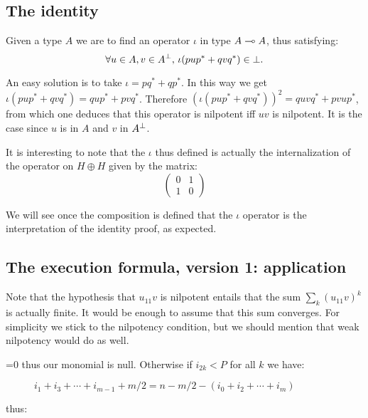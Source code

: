 \subsection{The identity}\label{the-identity}

Given a type \(A\) we are to find an operator \(\iota\) in type
\(A\multimap A\), thus satisfying:
\begin{equation*}
\forall u\in A, v\in A^\bot,\, \iota(pup^* + qvq^*)\in\bot.
\end{equation*}

An easy solution is to take \(\iota = pq^* + qp^*\). In this way we get
\(\iota(pup^* + qvq^*) = qup^* + pvq^*\). Therefore
\((\iota(pup^* + qvq^*))^2 = quvq^* + pvup^*\), from which one deduces
that this operator is nilpotent iff \(uv\) is nilpotent. It is the case
since \(u\) is in \(A\) and \(v\) in \(A^\bot\).

It is interesting to note that the \(\iota\) thus defined is actually
the internalization of the operator on \(H\oplus H\) given by the
matrix:
\begin{equation*}
  \begin{pmatrix}0 & 1\\1 & 0\end{pmatrix}
\end{equation*}

We will see once the composition is defined that the \(\iota\) operator
is the interpretation of the identity proof, as expected.

\subsection{The execution formula, version 1: application}\label{the-execution-formula-version-1-application}

Note that the hypothesis that \(u_{11}v\) is nilpotent entails that the
sum \(\sum_k(u_{11}v)^k\) is actually finite. It would be enough to
assume that this sum converges. For simplicity we stick to the
nilpotency condition, but we should mention that weak nilpotency would
do as well.

=0 thus our monomial is null. Otherwise if \(i_{2k}<P\) for all \(k\) we
have:

\begin{description}
\item[]
\(i_1+i_3+\cdots +i_{m-1} + m/2 = n - m/2 - (i_0+i_2+\cdots +i_m)\)
\end{description}

thus:


